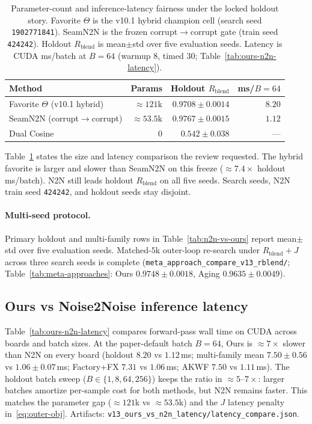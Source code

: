 \begin{table}[t]
  \centering
  \caption{Parameter-count and inference-latency fairness under the locked holdout story.
    Favorite $\Theta$ is the v10.1 hybrid champion cell (search seed \texttt{1902771841}).
    SeamN2N is the frozen corrupt$\to$corrupt gate (train seed \texttt{424242}).
    Holdout $R_{\mathrm{blend}}$ is mean$\pm$std over five evaluation seeds.
    Latency is CUDA ms/batch at $B{=}64$ (warmup 8, timed 30; Table~\ref{tab:ours-n2n-latency}).}
  \label{tab:param-fairness}
  \setlength{\tabcolsep}{4pt}
  \begin{tabular}{@{}lrrr@{}}
    \toprule
    Method & Params & Holdout $R_{\mathrm{blend}}$ & ms/$B{=}64$ \\
    \midrule
    Favorite $\Theta$ (v10.1 hybrid) & ${\approx}121$k & $0.9708{\pm}0.0014$ & $8.20$ \\
    SeamN2N (corrupt$\to$corrupt) & ${\approx}53.5$k & $0.9767{\pm}0.0015$ & $1.12$ \\
    Dual Cosine & $0$ & $0.542{\pm}0.038$ & --- \\
    \bottomrule
  \end{tabular}
\end{table}

\noindent
Table~\ref{tab:param-fairness} states the size and latency comparison the review requested.
The hybrid favorite is larger and slower than SeamN2N on this freeze (${\approx}7.4\times$ holdout ms/batch).
N2N still leads holdout $R_{\mathrm{blend}}$ on all five seeds.
Search seeds, N2N train seed \texttt{424242}, and holdout seeds stay disjoint.

\paragraph{Multi-seed protocol.}
Primary holdout and multi-family rows in Table~\ref{tab:n2n-vs-ours} report mean$\pm$std over five evaluation seeds.
Matched-$5$k outer-loop re-search under $R_{\mathrm{blend}}{+}J$ across three search seeds is complete
(\texttt{meta\_approach\_compare\_v13\_rblend/}; Table~\ref{tab:meta-approaches}:
Ours $0.9748{\pm}0.0018$, Aging $0.9635{\pm}0.0049$).

\subsection{Ours vs Noise2Noise inference latency}
\label{sec:ours-n2n-latency}
Table~\ref{tab:ours-n2n-latency} compares forward-pass wall time on CUDA across boards and batch sizes.
At the paper-default batch $B{=}64$, Ours is ${\approx}7\times$ slower than N2N on every board
(holdout $8.20$ vs $1.12$\,ms; multi-family mean $7.50{\pm}0.56$ vs $1.06{\pm}0.07$\,ms;
Factory+FX $7.31$ vs $1.06$\,ms; AKWF $7.50$ vs $1.11$\,ms).
The holdout batch sweep ($B\in\{1,8,64,256\}$) keeps the ratio in ${\approx}5$--$7\times$:
larger batches amortize per-sample cost for both methods, but N2N remains faster.
This matches the parameter gap (${\approx}121$k vs ${\approx}53.5$k) and the $J$ latency penalty in~\eqref{eq:outer-obj}.
Artifacts: \texttt{v13\_ours\_vs\_n2n\_latency/latency\_compare.json}.

